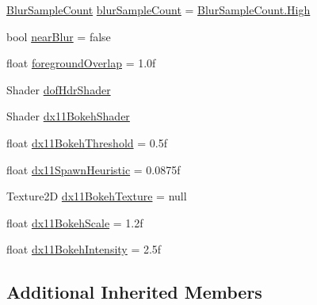 \begin{DoxyCompactItemize}
\item 
\mbox{\hyperlink{class_unity_standard_assets_1_1_image_effects_1_1_depth_of_field_abd4e71b10ed1bbe087a4f15b735bb77b}{Blur\+Sample\+Count}} \mbox{\hyperlink{class_unity_standard_assets_1_1_image_effects_1_1_depth_of_field_a79b3c2dc0bf00731edc9150125298d56}{blur\+Sample\+Count}} = \mbox{\hyperlink{class_unity_standard_assets_1_1_image_effects_1_1_depth_of_field_abd4e71b10ed1bbe087a4f15b735bb77ba655d20c1ca69519ca647684edbb2db35}{Blur\+Sample\+Count.\+High}}
\item 
bool \mbox{\hyperlink{class_unity_standard_assets_1_1_image_effects_1_1_depth_of_field_a320c2a01deba4163eb1d59859138af87}{near\+Blur}} = false
\item 
float \mbox{\hyperlink{class_unity_standard_assets_1_1_image_effects_1_1_depth_of_field_ab0c29edb4b60698fceec9cacd8fd3244}{foreground\+Overlap}} = 1.\+0f
\item 
Shader \mbox{\hyperlink{class_unity_standard_assets_1_1_image_effects_1_1_depth_of_field_ab63083979e9b67f76bec3680649c1180}{dof\+Hdr\+Shader}}
\item 
Shader \mbox{\hyperlink{class_unity_standard_assets_1_1_image_effects_1_1_depth_of_field_a522b18b10cb57435c838f4c0ed882a9b}{dx11\+Bokeh\+Shader}}
\item 
float \mbox{\hyperlink{class_unity_standard_assets_1_1_image_effects_1_1_depth_of_field_ae0a34fe8b7159771781da518fd321901}{dx11\+Bokeh\+Threshold}} = 0.\+5f
\item 
float \mbox{\hyperlink{class_unity_standard_assets_1_1_image_effects_1_1_depth_of_field_a98494f92168e3f4ba20429b95176de13}{dx11\+Spawn\+Heuristic}} = 0.\+0875f
\item 
Texture2D \mbox{\hyperlink{class_unity_standard_assets_1_1_image_effects_1_1_depth_of_field_af8ca61f949a81d24c895977dd0d2e390}{dx11\+Bokeh\+Texture}} = null
\item 
float \mbox{\hyperlink{class_unity_standard_assets_1_1_image_effects_1_1_depth_of_field_aba6dc6afacf45f686c40dbdd7ead1505}{dx11\+Bokeh\+Scale}} = 1.\+2f
\item 
float \mbox{\hyperlink{class_unity_standard_assets_1_1_image_effects_1_1_depth_of_field_ac8b7ae7038cb3b009cd8084fa67eae37}{dx11\+Bokeh\+Intensity}} = 2.\+5f
\end{DoxyCompactItemize}
\subsection*{Additional Inherited Members}


